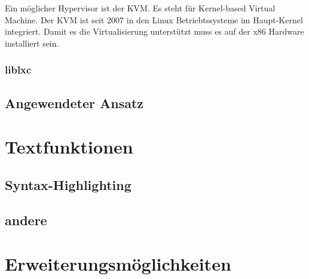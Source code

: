 \documentclass[10pt]{article}
\begin{document}
	Ein möglicher Hypervisor ist der KVM. Es steht für Kernel-based Virtual Machine. Der KVM ist seit 2007 in den Linux Betriebtssysteme im Haupt-Kernel integriert.%
	Damit es die Virtualisierung unterstützt muss es auf der x86 Hardware installiert sein.
	
	
	\subsubsection{liblxc}
	
	
	\pagebreak
	\subsection{Angewendeter Ansatz}
	
	\pagebreak
	\section{Textfunktionen}
	\subsection{Syntax-Highlighting}
	\subsection{andere}
	\pagebreak
	\section{Erweiterungsmöglichkeiten}
	\pagebreak
	\listoffigures
	
\end{document}
